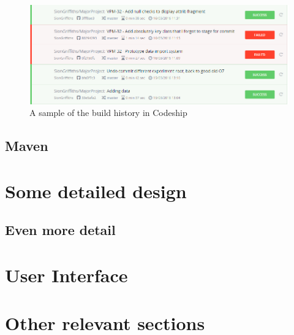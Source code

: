 \begin{figure}[H]
    \centering
    \includegraphics[width=\textwidth]{images/tools/codeShipSmall}
    \caption{A sample of the build history in Codeship}
    \label{fig:build_history}
\end{figure} 



\subsection{Maven}

\section{Some detailed design}

\subsection{Even more detail}

\section{User Interface}

\section{Other relevant sections}